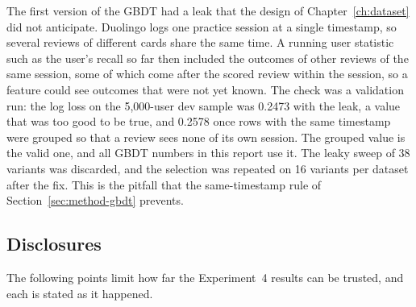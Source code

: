 The first version of the GBDT had a leak that the design of Chapter~\ref{ch:dataset} did not anticipate. Duolingo logs one practice session at a single
timestamp, so several reviews of different cards share the same time. A running user statistic such as the user's recall so far then
included the outcomes of other reviews of the same session, some of which come after the scored review within the session, so a feature could see
outcomes that were not yet known. The check was a validation run: the log loss on the 5,000-user dev sample was 0.2473 with the leak, a value that was too good
to be true, and 0.2578 once rows with the same timestamp were grouped so that a review sees none of its own session. The grouped value is the valid one, and all
GBDT numbers in this report use it. The leaky sweep of 38 variants was discarded, and the selection was repeated on 16 variants per dataset after the fix. This is the pitfall that the same-timestamp rule of
Section~\ref{sec:method-gbdt} prevents.

\subsection{Disclosures}
\label{sec:results-exp4-disclosures}

The following points limit how far the Experiment~4 results can be trusted, and each is stated as it happened.

